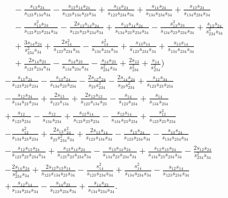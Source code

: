 \begin{align}
  & \quad - \frac{s_{13}s_{24}}{s_{123}s_{134}s_{34}} - \frac{s_{13}s_{14}s_{24}}{s_{123}s_{134}s_{23}s_{34}} + \frac{s_{14}s_{24}}{s_{123}s_{234}s_{34}} + \frac{s_{14}s_{24}}{s_{134}s_{234}s_{34}} + \frac{s_{13}s_{24}}{s_{134}s_{234}s_{34}} \nonumber \\
  & \quad - \frac{s_{13}^2s_{24}}{s_{123}s_{23}s_{234}s_{34}} - \frac{2s_{13}s_{14}s_{24}}{s_{123}s_{23}s_{234}s_{34}} + \frac{s_{13}s_{14}s_{24}}{s_{134}s_{23}s_{234}s_{34}} - \frac{s_{13}^2s_{24}}{s_{134}s_{23}s_{234}s_{34}} + \frac{s_{13}s_{24}}{s_{234}^2s_{34}} \nonumber \\
  & \quad + \frac{3s_{14}s_{24}}{s_{234}^2s_{34}} + \frac{2s_{14}^2}{s_{123}s_{234}s_{34}} - \frac{s_{14}^2}{s_{134}s_{234}s_{34}} + \frac{s_{13}s_{14}}{s_{123}s_{234}s_{34}} + \frac{s_{13}s_{14}}{s_{134}s_{234}s_{34}} \nonumber \\
  & \quad + \frac{2s_{14}s_{23}}{s_{123}s_{234}s_{34}} - \frac{s_{14}s_{23}}{s_{134}s_{234}s_{34}} - \frac{s_{14}s_{23}}{s_{234}^2s_{34}} + \frac{2s_{13}}{s_{234}^2} + \frac{s_{14}}{s_{234}^2} \Bigg) \nonumber \\
& - \frac{s_{13}s_{24}}{s_{123}s_{23}s_{234}} - \frac{s_{13}s_{24}}{s_{134}s_{23}s_{234}} - \frac{2s_{12}s_{24}}{s_{23}s_{234}^2} - \frac{2s_{14}s_{24}}{s_{23}s_{234}^2} + \frac{s_{12}s_{34}}{s_{123}s_{23}s_{234}} \nonumber \\
& - \frac{s_{12}s_{34}}{s_{134}s_{23}s_{234}} + \frac{2s_{13}}{s_{123}s_{134}} + \frac{2s_{12}s_{13}}{s_{123}s_{134}s_{23}} - \frac{s_{14}}{s_{123}s_{234}} + \frac{s_{14}}{s_{134}s_{234}} \nonumber \\
& + \frac{s_{12}}{s_{123}s_{234}} - \frac{s_{12}}{s_{134}s_{234}} + \frac{s_{12}s_{14}}{s_{123}s_{23}s_{234}} - \frac{s_{12}s_{14}}{s_{134}s_{23}s_{234}} + \frac{s_{12}^2}{s_{123}s_{23}s_{234}} \nonumber \\
& - \frac{s_{12}^2}{s_{134}s_{23}s_{234}} + \frac{2s_{13}s_{24}^2}{s_{23}s_{234}^2s_{34}} + \frac{2s_{13}s_{14}}{s_{123}s_{134}s_{34}} - \frac{s_{13}s_{24}}{s_{123}s_{234}s_{34}} - \frac{s_{13}s_{24}}{s_{134}s_{234}s_{34}} \nonumber \\
& - \frac{s_{12}s_{13}s_{24}}{s_{123}s_{23}s_{234}s_{34}} + \frac{s_{13}s_{14}s_{24}}{s_{123}s_{23}s_{234}s_{34}} - \frac{s_{13}s_{14}s_{24}}{s_{134}s_{23}s_{234}s_{34}} + \frac{s_{12}s_{13}s_{24}}{s_{134}s_{23}s_{234}s_{34}} - \frac{2s_{12}s_{24}}{s_{234}^2s_{34}} \nonumber \\
& - \frac{2s_{14}s_{24}}{s_{234}^2s_{34}} + \frac{2s_{12}s_{13}s_{14}}{s_{123}s_{134}s_{23}s_{34}} - \frac{s_{14}^2}{s_{123}s_{234}s_{34}} + \frac{s_{14}^2}{s_{134}s_{234}s_{34}} - \frac{s_{12}s_{14}}{s_{123}s_{234}s_{34}} \nonumber \\
& + \frac{s_{12}s_{14}}{s_{134}s_{234}s_{34}} - \frac{s_{14}s_{23}}{s_{123}s_{234}s_{34}} + \frac{s_{14}s_{23}}{s_{134}s_{234}s_{34}}.
\end{align}
